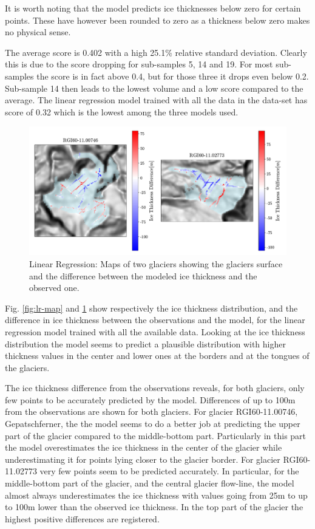 It is worth noting that the model predicts ice thicknesses below zero for certain points. These have however been rounded to zero as a thickness below zero makes no physical sense.

The average score is 0.402 with a high 25.1\% relative standard deviation. Clearly this is due to the score dropping for sub-samples 5, 14 and 19. For most sub-samples the score is in fact above 0.4, but for those three it drops even below 0.2. Sub-sample 14 then leads to the lowest volume and a low score compared to the average.
The linear regression model trained with all the data in the data-set has score of 0.32 which  is the lowest among the three models used.

\begin{figure}[!tp]
	\centering		  
	\includegraphics[width=1.\textwidth]{figures/LR_thick_diff_map.pdf}
	\caption{Linear Regression: Maps of two glaciers showing the glaciers surface and the difference between the modeled ice thickness and the  observed one.}
	\label{fig:lr-diff-map}
\end{figure}

Fig. \ref{fig:lr-map} and \ref{fig:lr-diff-map} show respectively the ice thickness distribution, and the difference in ice thickness between the observations and the model, for the linear regression model trained with all the available data. Looking at the ice thickness distribution the model seems to predict a plausible distribution with higher thickness values in the center and lower ones at the borders and at the tongues of the glaciers. 
 
The ice thickness difference from the observations reveals, for both glaciers, only few points to be accurately predicted by the model. Differences of up to 100m from the observations are shown for both glaciers. For glacier RGI60-11.00746, Gepatschferner, the the model seems to do a better job at predicting the upper part of the glacier compared to the middle-bottom part. Particularly in this part the model overestimates the ice thickness in the center of the glacier while underestimating it for points lying closer to the glacier border. For glacier RGI60-11.02773 very few points seem to be predicted accurately. In particular, for the middle-bottom part of the glacier, and the central glacier flow-line, the model almost always underestimates the ice thickness with values going from 25m to up to 100m lower than the observed ice thickness. In the top part of the glacier the highest positive differences are registered.

